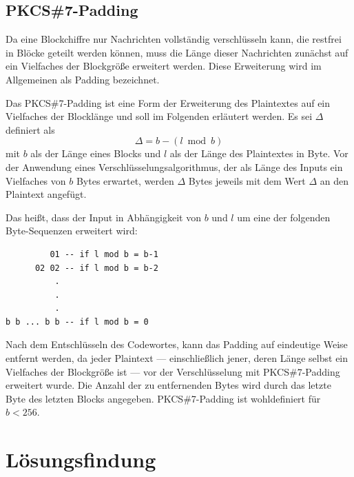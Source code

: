 \documentclass[course=erap]{aspdoc}
\begin{document}
\subsection{PKCS\#7-Padding}

Da eine Blockchiffre nur Nachrichten vollständig verschlüsseln kann, die restfrei in Blöcke geteilt werden können, muss die Länge dieser Nachrichten zunächst auf ein Vielfaches der Blockgröße erweitert werden. Diese Erweiterung wird im Allgemeinen als Padding bezeichnet.\bigbreak

Das PKCS\#7-Padding ist eine Form der Erweiterung des Plaintextes auf ein Vielfaches der Blocklänge und soll im Folgenden erläutert werden. Es sei $\Delta$ definiert als
\[
    \Delta = b - (l \bmod b)
\]
mit $b$ als der Länge eines Blocks und $l$ als der Länge des Plaintextes in Byte. Vor der Anwendung eines Verschlüsselungsalgorithmus, der als Länge des Inputs ein Vielfaches von $b$ Bytes erwartet, werden $\Delta$ Bytes jeweils mit dem Wert $\Delta$ an den Plaintext angefügt.\cite[p.28]{rfc5652}\bigbreak

Das heißt, dass der Input in Abhängigkeit von $b$ und $l$ um eine der folgenden Byte-Sequenzen erweitert wird:

\begin{samepage}
\begin{verbatim}
         01 -- if l mod b = b-1
      02 02 -- if l mod b = b-2
          .
          .
          .
b b ... b b -- if l mod b = 0
\end{verbatim}
\end{samepage}

Nach dem Entschlüsseln des Codewortes, kann das Padding auf eindeutige Weise entfernt werden, da jeder Plaintext --- einschließlich jener, deren Länge selbst ein Vielfaches der Blockgröße ist --- vor der Verschlüsselung mit PKCS\#7-Padding erweitert wurde. Die Anzahl der zu entfernenden Bytes wird durch das letzte Byte des letzten Blocks angegeben. PKCS\#7-Padding ist wohldefiniert für $b < 256$.\cite[p.28]{rfc5652}

\section{Lösungsfindung}
\end{document}
